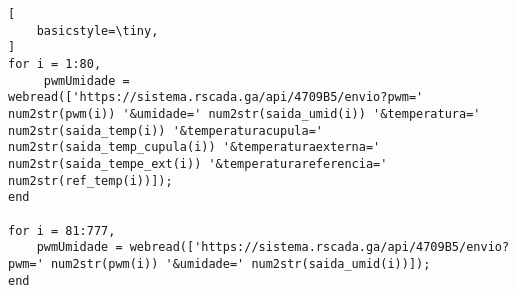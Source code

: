 \label{ap:apendice-incubadora-neonatal}

\begin{lstlisting}[
    basicstyle=\tiny,
]
for i = 1:80,
     pwmUmidade = webread(['https://sistema.rscada.ga/api/4709B5/envio?pwm=' num2str(pwm(i)) '&umidade=' num2str(saida_umid(i)) '&temperatura=' num2str(saida_temp(i)) '&temperaturacupula=' num2str(saida_temp_cupula(i)) '&temperaturaexterna=' num2str(saida_tempe_ext(i)) '&temperaturareferencia=' num2str(ref_temp(i))]);
end

for i = 81:777,
    pwmUmidade = webread(['https://sistema.rscada.ga/api/4709B5/envio?pwm=' num2str(pwm(i)) '&umidade=' num2str(saida_umid(i))]);
end
\end{lstlisting}